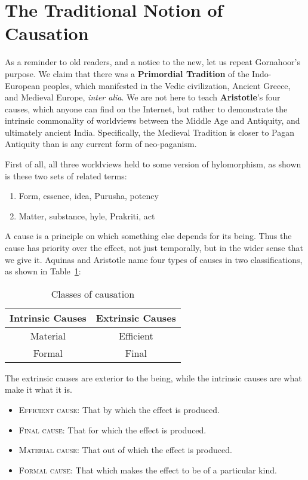 \section{The Traditional Notion of Causation}

As a reminder to old readers, and a notice to the new, let us repeat Gornahoor's purpose. We claim that there was a \textbf{Primordial Tradition} of the Indo-European peoples, which manifested in the Vedic civilization, Ancient Greece, and Medieval Europe, \emph{inter alia}. We are not here to teach \textbf{Aristotle}'s four causes, which anyone can find on the Internet, but rather to demonstrate the intrinsic commonality of worldviews between the Middle Age and Antiquity, and ultimately ancient India. Specifically, the Medieval Tradition is closer to Pagan Antiquity than is any current form of neo-paganism.

First of all, all three worldviews held to some version of hylomorphism, as shown is these two sets of related terms:

\begin{enumerate}
\item Form, essence, idea, Purusha, potency 
\item Matter, substance, hyle, Prakriti, act 
\end{enumerate}

A cause is a principle on which something else depends for its being. Thus the cause has priority over the effect, not just temporally, but in the wider sense that we give it. Aquinas and Aristotle name four types of causes in two classifications, as shown in Table~\ref{tab:causation}:

\begin{table}[ht]
\centering
\begin{tabular}{cc}
\toprule
Intrinsic Causes &
Extrinsic Causes\\\midrule
Material &
Efficient\\\midrule
Formal &
Final\\\bottomrule
\end{tabular}
\label{tab:causation}
\caption{Classes of causation}
\end{table}

The extrinsic causes are exterior to the being, while the intrinsic causes are what make it what it is.

\begin{itemize}
\item\textsc{Efficient cause:} That by which the effect is produced. 

\item\textsc{Final cause:} That for which the effect is produced. 

\item\textsc{Material cause:} That out of which the effect is produced. 

\item\textsc{Formal cause:} That which makes the effect to be of a particular kind. 

\end{itemize}

